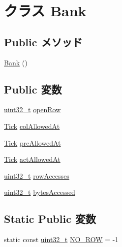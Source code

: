 \hypertarget{classDRAMCtrl_1_1Bank}{
\section{クラス Bank}
\label{classDRAMCtrl_1_1Bank}
}
\subsection*{Public メソッド}
\begin{DoxyCompactItemize}
\item 
\hyperlink{classDRAMCtrl_1_1Bank_a271cedab6e0be527fb734df530225686}{Bank} ()
\end{DoxyCompactItemize}
\subsection*{Public 変数}
\begin{DoxyCompactItemize}
\item 
\hyperlink{Type_8hh_a435d1572bf3f880d55459d9805097f62}{uint32\_\-t} \hyperlink{classDRAMCtrl_1_1Bank_a1c7dd95b87279d92d9a9bbcfed850ddf}{openRow}
\item 
\hyperlink{base_2types_8hh_a5c8ed81b7d238c9083e1037ba6d61643}{Tick} \hyperlink{classDRAMCtrl_1_1Bank_a7427bdcfd6e622f1dcef902e3151f822}{colAllowedAt}
\item 
\hyperlink{base_2types_8hh_a5c8ed81b7d238c9083e1037ba6d61643}{Tick} \hyperlink{classDRAMCtrl_1_1Bank_a6b5a4430002d443a4554dbe50d754a4b}{preAllowedAt}
\item 
\hyperlink{base_2types_8hh_a5c8ed81b7d238c9083e1037ba6d61643}{Tick} \hyperlink{classDRAMCtrl_1_1Bank_aed744bd1f16791b6a50c73f78d86a63f}{actAllowedAt}
\item 
\hyperlink{Type_8hh_a435d1572bf3f880d55459d9805097f62}{uint32\_\-t} \hyperlink{classDRAMCtrl_1_1Bank_a92cca9826301cce285e011714476dbbb}{rowAccesses}
\item 
\hyperlink{Type_8hh_a435d1572bf3f880d55459d9805097f62}{uint32\_\-t} \hyperlink{classDRAMCtrl_1_1Bank_a9e3845d35a835259678291e0f5db84b9}{bytesAccessed}
\end{DoxyCompactItemize}
\subsection*{Static Public 変数}
\begin{DoxyCompactItemize}
\item 
static const \hyperlink{Type_8hh_a435d1572bf3f880d55459d9805097f62}{uint32\_\-t} \hyperlink{classDRAMCtrl_1_1Bank_a4c1f8277dd32c2b530a7acc4969310f1}{NO\_\-ROW} = -\/1
\end{DoxyCompactItemize}


